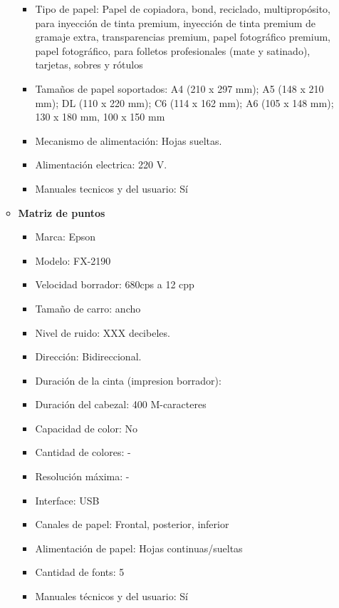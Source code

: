 \begin{enumerate}
\begin{itemize}
\begin{itemize}
      \item Tipo de papel: Papel de copiadora, bond, reciclado, multipropósito, para inyección de tinta premium, inyección de tinta premium de gramaje extra, transparencias premium, papel fotográfico premium, papel fotográfico, para folletos profesionales (mate y satinado), tarjetas, sobres y rótulos
      \item Tamaños de papel soportados: A4 (210 x 297 mm); A5 (148 x 210 mm); DL (110 x 220 mm); C6 (114 x 162 mm); A6 (105 x 148 mm); 130 x 180 mm, 100 x 150 mm
      \item Mecanismo de alimentación: Hojas sueltas.
      
      \item Alimentación electrica: 220 V.
      \item Manuales tecnicos y del usuario: Sí
    \end{itemize}
    
    \item \textbf{Matriz de puntos}
    \begin{itemize}
      \item Marca: Epson
      \item Modelo: FX-2190
      \item Velocidad borrador: 680cps a 12 cpp
      \item Tamaño de carro: ancho
      \item Nivel de ruido: XXX decibeles.
      \item Dirección: Bidireccional.
      \item Duración de la cinta (impresion borrador):
      \item Duración del cabezal: 400 M-caracteres
      
      \item Capacidad de color: No
      \item Cantidad de colores: -
      \item Resolución máxima: -
      
      \item Interface: USB
      
      \item Canales de papel: Frontal, posterior, inferior
      \item Alimentación de papel: Hojas continuas/sueltas
      
      \item Cantidad de fonts: 5
      
      \item Manuales técnicos y del usuario: Sí
    \end{itemize}
    

\end{itemize}
\end{enumerate}
